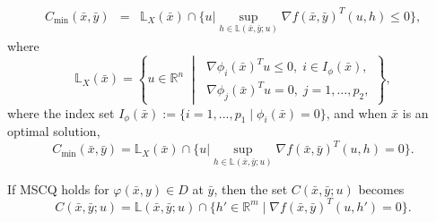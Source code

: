 \documentclass[11pt]{article}
\numberwithin{equation}{section}
\begin{document}
{\begin{eqnarray*}
	C_{\min}(\bar x,\bar y)
	&=& \mathbb{L}_X(\bar x)\cap \{ u|\sup\limits_{h \in \mathbb{L}(\bar x,\bar y;u)} \nabla f(\bar x,\bar y)^T(u,h) \leq  0\},
\end{eqnarray*} where 
$$\mathbb{L}_X(\bar x)=\left\{ u \in \mathbb{R}^n \;\middle |\;\begin{array}{l}
		\nabla \phi_i(\bar x)^T u \leq 0, \; i \in I_\phi(\bar x),\\
		\nabla \phi_j(\bar x)^T u = 0, \; j=1,\dots,p_2,\end{array}  \right \},$$
		where the index set $I_\phi(\bar x):=\{i=1,...,p_1 \mid \phi_i(\bar x)=0\}$, and when $\bar x$ is an optimal solution,
$$ C_{\min}(\bar x,\bar y)
	= \mathbb{L}_X(\bar x)\cap \{ u|\sup\limits_{h \in \mathbb{L}(\bar x,\bar y;u)} \nabla f(\bar x,\bar y)^T(u,h) =  0\}.$$

If MSCQ holds for $\varphi(\bar x,y)\in D$ at $\bar y$, then the set $C(\bar x,\bar y;u)$ becomes
$$
	C(\bar x,\bar y;u)= \mathbb{L}(\bar x,\bar y;u) 
	\cap \{ h' \in \mathbb{R}^m \mid \nabla f(\bar x,\bar y)^T (u,h') = 0 \}.
$$




}
\end{document}
